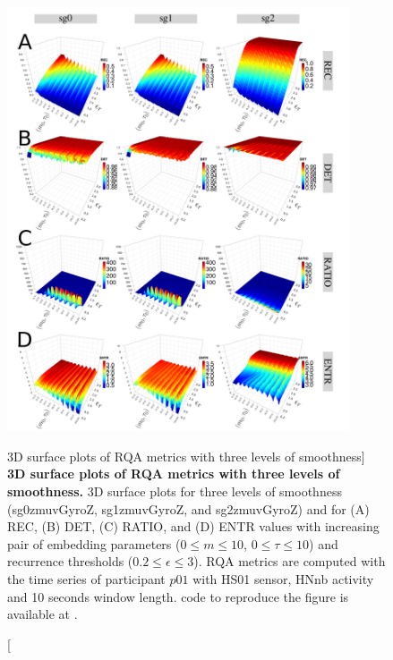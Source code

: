 \begin{figure}
\centering
\includegraphics[width=0.9\textwidth]{fig_5_21}
    \caption
	[3D surface plots of RQA metrics with three levels of smoothness]{
	{\bf 3D surface plots of RQA metrics with three levels of smoothness.}
	3D surface plots for 
	three levels of smoothness (sg0zmuvGyroZ, sg1zmuvGyroZ, and sg2zmuvGyroZ) 
	and for (A) REC, (B) DET, (C) RATIO, and (D) ENTR values 
	with increasing pair of embedding parameters 
	($0 \le m \le 10$, $0 \le \tau \le 10$) 
	and recurrence thresholds ($ 0.2 \le \epsilon \le 3 $).
	RQA metrics are computed with the time series of participant $p01$ with
	HS01 sensor, HNnb activity and 10 seconds window length.
	\R code to reproduce the figure is available at 
	.
 }
\label{fig:topo_smoothness_hii}
\end{figure}

\newpage
